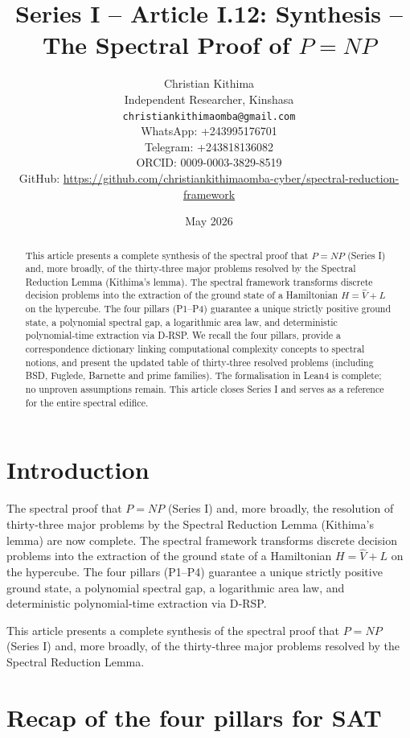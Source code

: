 \documentclass[11pt,a4paper]{article}
\title{Series I – Article I.12: Synthesis – The Spectral Proof of \(P = NP\)}
\author{Christian Kithima \\
Independent Researcher, Kinshasa \\
\texttt{christiankithimaomba@gmail.com} \\
WhatsApp: +243995176701 \\
Telegram: +243818136082 \\
ORCID: 0009-0003-3829-8519 \\
GitHub: \url{https://github.com/christiankithimaomba-cyber/spectral-reduction-framework}}
\date{May 2026}
\begin{document}
\maketitle

\begin{abstract}
This article presents a complete synthesis of the spectral proof that \(P = NP\) (Series I) and, more broadly, of the thirty‑three major problems resolved by the Spectral Reduction Lemma (Kithima's lemma). The spectral framework transforms discrete decision problems into the extraction of the ground state of a Hamiltonian \(H = \hat{V} + L\) on the hypercube. The four pillars (P1–P4) guarantee a unique strictly positive ground state, a polynomial spectral gap, a logarithmic area law, and deterministic polynomial‑time extraction via D‑RSP. We recall the four pillars, provide a correspondence dictionary linking computational complexity concepts to spectral notions, and present the updated table of thirty‑three resolved problems (including BSD, Fuglede, Barnette and prime families). The formalisation in Lean4 is complete; no unproven assumptions remain. This article closes Series I and serves as a reference for the entire spectral edifice.
\end{abstract}

\tableofcontents

\section{Introduction}

The spectral proof that \(P = NP\) (Series I) and, more broadly, the resolution of thirty‑three major problems by the Spectral Reduction Lemma (Kithima's lemma) are now complete. The spectral framework transforms discrete decision problems into the extraction of the ground state of a Hamiltonian \(H = \hat{V} + L\) on the hypercube. The four pillars (P1–P4) guarantee a unique strictly positive ground state, a polynomial spectral gap, a logarithmic area law, and deterministic polynomial‑time extraction via D‑RSP.

This article presents a complete synthesis of the spectral proof that \(P = NP\) (Series I) and, more broadly, of the thirty‑three major problems resolved by the Spectral Reduction Lemma.

\section{Recap of the four pillars for SAT}
\end{document}
